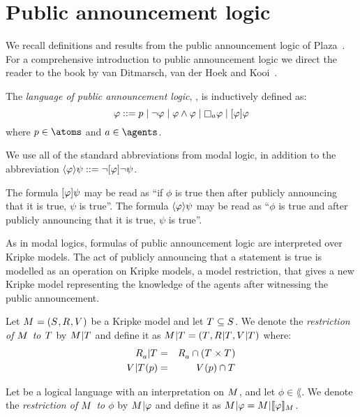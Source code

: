 \section{Public announcement logic}\label{pal}

We recall definitions and results from the public announcement logic of Plaza~\cite{plaza:1989}.
For a comprehensive introduction to public announcement logic we direct the reader to the book by van Ditmarsch, van der Hoek and Kooi~\cite{vanditmarsch:2007}.

\begin{definition}
The {\em language of public announcement logic}, \langPal{}, is inductively defined as:
$$
\phi ::= 
    \atomP \mid
    \lnot \phi \mid
    \phi \land \phi \mid
    \necessaryA \phi \mid
    \announceA{\phi} \phi
$$
where $\atomP \in \atoms$ and $\agentA \in \agents$.
\end{definition}

We use all of the standard abbreviations from modal logic, in addition to the abbreviation $\langle \varphi \rangle \psi ::= \lnot [ \varphi ] \lnot \psi$.

The formula $[ \varphi ] \psi$ may be read as ``if $\phi$ is true then after publicly announcing that it is true, $\psi$ is true''.
The formula $\langle \varphi \rangle \psi$ may be read as ``$\phi$ is true and after publicly announcing that it is true, $\psi$ is true''.

As in modal logics, formulas of public announcement logic are interpreted over Kripke models.
The act of publicly announcing that a statement is true is modelled as an operation on Kripke models, a model restriction, that gives a new Kripke model representing the knowledge of the agents after witnessing the public announcement.

\begin{definition}
Let $\kModelAndTuple$ be a Kripke model and let $\kStatesT \subseteq \kStates$.
We denote the {\em restriction of $\kModel$ to $\kStatesT$} by $\restrict{\kModel}{\kStatesT}$ and
define it as $\restrict{\kModel}{\kStatesT} = (\kStatesT, \restrict{\kAccessibilityRel}{\kStatesT}, \restrict{\kValuation}{\kStatesT})$ where:
\begin{eqnarray*}
    \restrict{\kAccessibilityA}{\kStatesT} &=& \kAccessibilityA \cap (\kStatesT \times \kStatesT)\\
    \restrict{\kValuation}{\kStatesT}(\atomP) &=& \kValuation(\atomP) \cap \kStatesT
\end{eqnarray*}

Let \lang{} be a logical language with an interpretation on $\kModel$, and let $\phi \in \lang$.
We denote the {\em restriction of $\kModel$ to $\phi$} by $\restrict{\kModel}{\phi}$ and define it as $\restrict{\kModel}{\phi} = \restrict{\kModel}{\interpretation[\kModel]{\phi}}$.
\end{definition}

